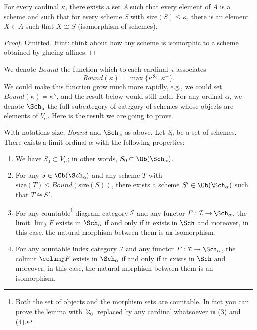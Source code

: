\begin{lemma}
\label{lemma-bounded-size}
For every cardinal $\kappa$, there exists a set $A$ such
that every element of $A$ is a scheme and such that for every
scheme $S$ with $\text{size}(S) \leq \kappa$, there is
an element $X \in A$ such that $X \cong S$ (isomorphism
of schemes).
\end{lemma}

\begin{proof}
Omitted. Hint: think about how any scheme is isomorphic to a scheme
obtained by glueing affines.
\end{proof}

\noindent
We denote $Bound$ the function which to each
cardinal $\kappa$ associates
\begin{equation}
\label{equation-bound}
Bound(\kappa) = \max\{\kappa^{\aleph_0}, \kappa^+\}.
\end{equation}
We could make this function grow much more rapidly, e.g., we could
set $Bound(\kappa) = \kappa^\kappa$, and the result below would still hold.
For any ordinal $\alpha$, we denote $\Sch_\alpha$ the full
subcategory of category of schemes whose objects are elements of
$V_\alpha$. Here is the result we are going to prove.

\begin{lemma}
\label{lemma-construct-category}
With notations $\text{size}$, $Bound$ and $\Sch_\alpha$ as above.
Let $S_0$ be a set of schemes. There exists a limit ordinal
$\alpha$ with the following properties:
\begin{enumerate}
\item
\label{item-inclusion}
We have $S_0 \subset V_\alpha$; in other words,
$S_0 \subset \Ob(\Sch_\alpha)$.
\item
\label{item-bounded}
For any $S \in \Ob(\Sch_\alpha)$ and any
scheme $T$ with $\text{size}(T) \leq Bound(\text{size}(S))$,
there exists a scheme $S' \in \Ob(\Sch_\alpha)$
such that $T \cong S'$.
\item
\label{item-limit}
For any countable\footnote{Both the set of objects and
the morphism sets are countable. In fact you can prove the lemma with
$\aleph_0$ replaced by any cardinal whatsoever in (3) and (4).} diagram
category $\mathcal{I}$ and
any functor $F : \mathcal{I} \to \Sch_\alpha$, the limit
$\lim_\mathcal{I} F$ exists in $\Sch_\alpha$ if and
only if it exists in $\Sch$ and moreover, in this case,
the natural morphism between them is an isomorphism.
\item
\label{item-colimit}
For any countable index category $\mathcal{I}$ and
any functor $F : \mathcal{I} \to \Sch_\alpha$, the colimit
$\colim_\mathcal{I} F$ exists in $\Sch_\alpha$ if and
only if it exists in $\Sch$ and moreover, in this case,
the natural morphism between them is an isomorphism.
\end{enumerate}
\end{lemma}

